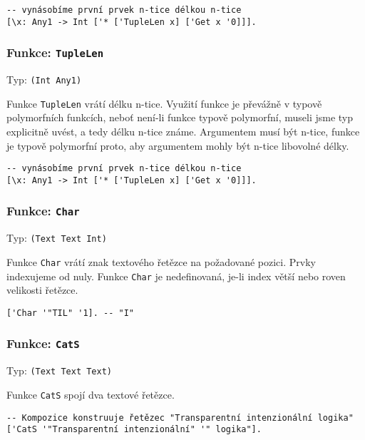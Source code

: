 \begin{lstlisting}[caption={Ukázka využití TupleLen}]
-- vynásobíme první prvek n-tice délkou n-tice
[\x: Any1 -> Int ['* ['TupleLen x] ['Get x '0]]].
\end{lstlisting}

\subsubsection*{Funkce: \lstinline{TupleLen}}
Typ: \lstinline{(Int Any1)}

Funkce \lstinline{TupleLen} vrátí délku n-tice. Využití funkce je převážně v typově polymorfních
funkcích, neboť není-li funkce typově polymorfní, museli jsme typ explicitně uvést, a tedy délku
n-tice známe. Argumentem musí být n-tice, funkce je typově polymorfní proto, aby argumentem mohly
být n-tice libovolné délky.

\begin{lstlisting}[caption={Ukázka využití TupleLen}]
-- vynásobíme první prvek n-tice délkou n-tice
[\x: Any1 -> Int ['* ['TupleLen x] ['Get x '0]]].
\end{lstlisting}

\subsubsection*{Funkce: \lstinline{Char}}
Typ: \lstinline{(Text Text Int)}

Funkce \lstinline{Char} vrátí znak textového řetězce na požadované pozici. Prvky indexujeme od nuly.
Funkce \lstinline{Char} je nedefinovaná, je-li index větší nebo roven velikosti řetězce.


\begin{lstlisting}[caption={Ukázka využití Char}]
['Char '"TIL" '1]. -- "I"
\end{lstlisting}

\subsubsection*{Funkce: \lstinline{CatS}}
Typ: \lstinline{(Text Text Text)}

Funkce \lstinline{CatS} spojí dva textové řetězce.

\begin{lstlisting}[caption={Ukázka využití Char}]
-- Kompozice konstruuje řetězec "Transparentní intenzionální logika"
['CatS '"Transparentní intenzionální" '" logika"].
\end{lstlisting}

